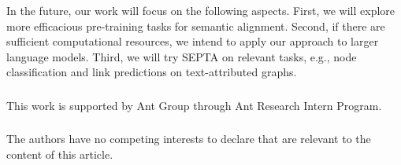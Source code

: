 \documentclass[runningheads]{llncs}
\begin{document}
In the future, our work will focus on the following aspects. First, we will explore more efficacious pre-training tasks for semantic alignment. Second, if there are sufficient computational resources, we intend to apply our approach to larger language models. Third, we will try SEPTA on relevant tasks, e.g., node classification and link predictions on text-attributed graphs.

\begin{credits}
\subsubsection{\ackname} This work is supported by Ant Group through Ant Research Intern Program.

\subsubsection{\discintname}
The authors have no competing interests to declare that are relevant to the content of this article.
\end{credits}
\end{document}
